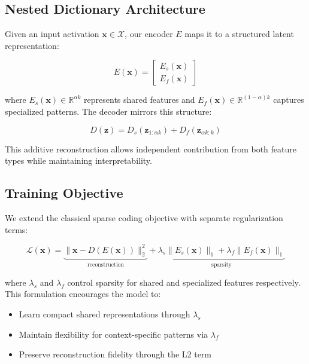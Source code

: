 \documentclass{article} %
\begin{document}
\subsection{Nested Dictionary Architecture}

Given an input activation $\mathbf{x} \in \mathcal{X}$, our encoder $E$ maps it to a structured latent representation:

\begin{equation}
    E(\mathbf{x}) = \begin{bmatrix} E_s(\mathbf{x}) \\ E_f(\mathbf{x}) \end{bmatrix}
\end{equation}

where $E_s(\mathbf{x}) \in \mathbb{R}^{\alpha k}$ represents shared features and $E_f(\mathbf{x}) \in \mathbb{R}^{(1-\alpha)k}$ captures specialized patterns. The decoder mirrors this structure:

\begin{equation}
    D(\mathbf{z}) = D_s(\mathbf{z}_{1:\alpha k}) + D_f(\mathbf{z}_{\alpha k:k})
\end{equation}

This additive reconstruction allows independent contribution from both feature types while maintaining interpretability.

\subsection{Training Objective}

We extend the classical sparse coding objective with separate regularization terms:

\begin{equation}
    \mathcal{L}(\mathbf{x}) = \underbrace{\|\mathbf{x} - D(E(\mathbf{x}))\|_2^2}_\text{reconstruction} + \underbrace{\lambda_s\|E_s(\mathbf{x})\|_1 + \lambda_f\|E_f(\mathbf{x})\|_1}_\text{sparsity}
\end{equation}

where $\lambda_s$ and $\lambda_f$ control sparsity for shared and specialized features respectively. This formulation encourages the model to:
\begin{itemize}
    \item Learn compact shared representations through $\lambda_s$
    \item Maintain flexibility for context-specific patterns via $\lambda_f$
    \item Preserve reconstruction fidelity through the L2 term
\end{itemize}
\end{document}
